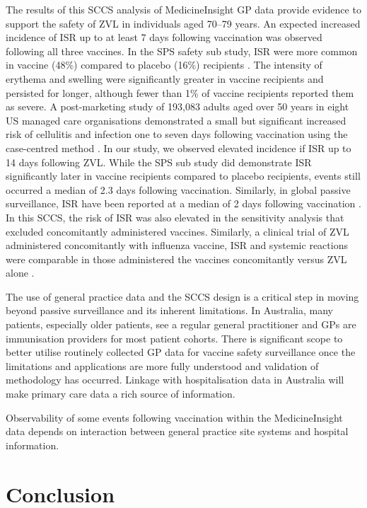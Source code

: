 \documentclass[review, endfloat]{elsarticle}
\begin{document}
The results of this SCCS analysis of MedicineInsight GP data provide evidence to support the safety of ZVL in individuals aged 70–79 years. An expected increased incidence of ISR up to at least 7 days following vaccination was observed following all three vaccines. In the SPS safety sub study, ISR were more common in vaccine (48\%) compared to placebo (16\%) recipients \citep{simberkoff2010}. The intensity of erythema and swelling were significantly greater in vaccine recipients and persisted for longer, although fewer than 1\% of vaccine recipients reported them as severe. A post-marketing study of 193,083 adults aged over 50 years in eight US managed care organisations demonstrated a small but significant increased risk of cellulitis and infection one to seven days following vaccination using the case-centred method \citep{tseng2012}. In our study, we observed elevated incidence if ISR up to 14 days following ZVL. While the SPS sub study did demonstrate ISR significantly later in vaccine recipients compared to placebo recipients, events still occurred a median of 2.3 days following vaccination. Similarly, in global passive surveillance, ISR have been reported at a median of 2 days following vaccination \citep{willis2017herpes}. In this SCCS, the risk of ISR was also elevated in the sensitivity analysis that excluded concomitantly administered vaccines. Similarly, a clinical trial of ZVL administered concomitantly with influenza vaccine, ISR and systemic reactions were comparable in those administered the vaccines concomitantly versus ZVL alone \citep{levin2018immunogenicity}.

The use of general practice data and the SCCS design is a critical step in moving beyond passive surveillance and its inherent limitations. In Australia, many patients, especially older patients, see a regular general practitioner and GPs are immunisation providers for most patient cohorts. There is significant scope to better utilise routinely collected GP data for vaccine safety surveillance once the limitations and applications are more fully understood and validation of methodology has occurred. Linkage with hospitalisation data in Australia will make primary care data a rich source of information.

Observability of some events following vaccination within the MedicineInsight data depends on interaction between general practice site systems and hospital information.

\section{Conclusion}
\end{document}
